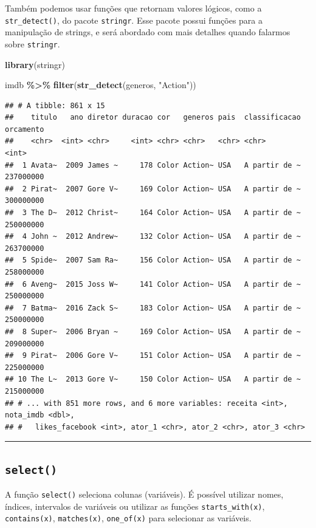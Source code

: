 \documentclass[
]{book}
\newenvironment{Shaded}{\begin{snugshade}}{\end{snugshade}}
\newcommand{\KeywordTok}[1]{\textcolor[rgb]{0.13,0.29,0.53}{\textbf{#1}}}
\newcommand{\NormalTok}[1]{#1}
\newcommand{\OperatorTok}[1]{\textcolor[rgb]{0.81,0.36,0.00}{\textbf{#1}}}
\newcommand{\StringTok}[1]{\textcolor[rgb]{0.31,0.60,0.02}{#1}}
\begin{document}
Também podemos usar funções que retornam valores lógicos, como a \texttt{str\_detect()}, do pacote \texttt{stringr}. Esse pacote possui funções para a manipulação de strings, e será abordado com mais detalhes quando falarmos sobre \texttt{stringr}.

\begin{Shaded}
\begin{Highlighting}[]
\KeywordTok{library}\NormalTok{(stringr)}

\NormalTok{imdb }\OperatorTok{\%>\%}
\StringTok{  }\KeywordTok{filter}\NormalTok{(}\KeywordTok{str\_detect}\NormalTok{(generos, }\StringTok{"Action"}\NormalTok{))}
\end{Highlighting}
\end{Shaded}

\begin{verbatim}
## # A tibble: 861 x 15
##    titulo   ano diretor duracao cor   generos pais  classificacao orcamento
##    <chr>  <int> <chr>     <int> <chr> <chr>   <chr> <chr>             <int>
##  1 Avata~  2009 James ~     178 Color Action~ USA   A partir de ~ 237000000
##  2 Pirat~  2007 Gore V~     169 Color Action~ USA   A partir de ~ 300000000
##  3 The D~  2012 Christ~     164 Color Action~ USA   A partir de ~ 250000000
##  4 John ~  2012 Andrew~     132 Color Action~ USA   A partir de ~ 263700000
##  5 Spide~  2007 Sam Ra~     156 Color Action~ USA   A partir de ~ 258000000
##  6 Aveng~  2015 Joss W~     141 Color Action~ USA   A partir de ~ 250000000
##  7 Batma~  2016 Zack S~     183 Color Action~ USA   A partir de ~ 250000000
##  8 Super~  2006 Bryan ~     169 Color Action~ USA   A partir de ~ 209000000
##  9 Pirat~  2006 Gore V~     151 Color Action~ USA   A partir de ~ 225000000
## 10 The L~  2013 Gore V~     150 Color Action~ USA   A partir de ~ 215000000
## # ... with 851 more rows, and 6 more variables: receita <int>, nota_imdb <dbl>,
## #   likes_facebook <int>, ator_1 <chr>, ator_2 <chr>, ator_3 <chr>
\end{verbatim}

\begin{center}\rule{0.5\linewidth}{0.5pt}\end{center}

\hypertarget{select}{%
\subsection{\texorpdfstring{\texttt{select()}}{select()}}\label{select}}

A função \texttt{select()} seleciona colunas (variáveis). É possível utilizar nomes, índices, intervalos de variáveis ou utilizar as funções \texttt{starts\_with(x)}, \texttt{contains(x)}, \texttt{matches(x)}, \texttt{one\_of(x)} para selecionar as variáveis.
\end{document}
